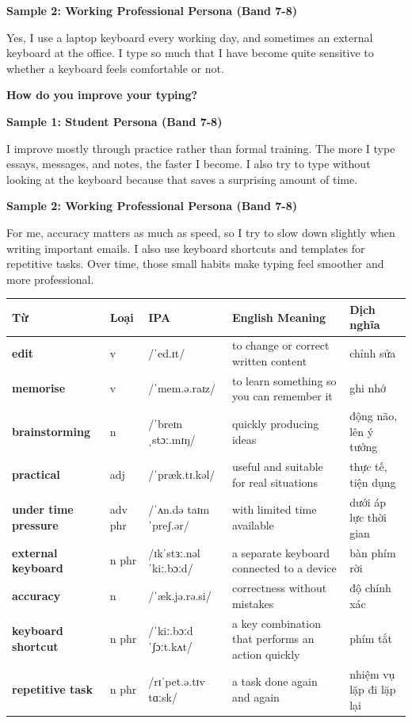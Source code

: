 \textbf{Sample 2: Working Professional Persona (Band 7-8)}

Yes, I use a laptop keyboard every working day, and sometimes an external keyboard at the office. I type so much that I have become quite sensitive to whether a keyboard feels comfortable or not.

\separator

\begin{ieltsquestion}
\textbf{How do you improve your typing?}
\end{ieltsquestion}
\textbf{Sample 1: Student Persona (Band 7-8)}

I improve mostly through practice rather than formal training. The more I type essays, messages, and notes, the faster I become. I also try to type without looking at the keyboard because that saves a surprising amount of time.

\textbf{Sample 2: Working Professional Persona (Band 7-8)}

For me, accuracy matters as much as speed, so I try to slow down slightly when writing important emails. I also use keyboard shortcuts and templates for repetitive tasks. Over time, those small habits make typing feel smoother and more professional.

\separator


\vspace{0.8em}
\begin{center}
\renewcommand{\arraystretch}{1.65}
\begin{tabularx}{\textwidth}{|V{0.22\textwidth}|C{0.07\textwidth}|I{0.20\textwidth}|Y|V{0.18\textwidth}|}
\hline
{}
\textbf{Từ} & \textbf{Loại} & \textbf{IPA} & \textbf{English Meaning} & \textbf{Dịch nghĩa} \\
\hline
\textbf{edit} & v & /ˈed.ɪt/ & to change or correct written content & chỉnh sửa \\ \hline
\textbf{memorise} & v & /ˈmem.ə.raɪz/ & to learn something so you can remember it & ghi nhớ \\ \hline
\textbf{brainstorming} & n & /ˈbreɪnˌstɔː.mɪŋ/ & quickly producing ideas & động não, lên ý tưởng \\ \hline
\textbf{practical} & adj & /ˈpræk.tɪ.kəl/ & useful and suitable for real situations & thực tế, tiện dụng \\ \hline
\textbf{under time pressure} & adv phr & /ˈʌn.də taɪm ˈpreʃ.ər/ & with limited time available & dưới áp lực thời gian \\ \hline
\textbf{external keyboard} & n phr & /ɪkˈstɜː.nəl ˈkiː.bɔːd/ & a separate keyboard connected to a device & bàn phím rời \\ \hline
\textbf{accuracy} & n & /ˈæk.jə.rə.si/ & correctness without mistakes & độ chính xác \\ \hline
\textbf{keyboard shortcut} & n phr & /ˈkiː.bɔːd ˈʃɔːt.kʌt/ & a key combination that performs an action quickly & phím tắt \\ \hline
\textbf{repetitive task} & n phr & /rɪˈpet.ə.tɪv tɑːsk/ & a task done again and again & nhiệm vụ lặp đi lặp lại \\ \hline
\end{tabularx}
\end{center}

